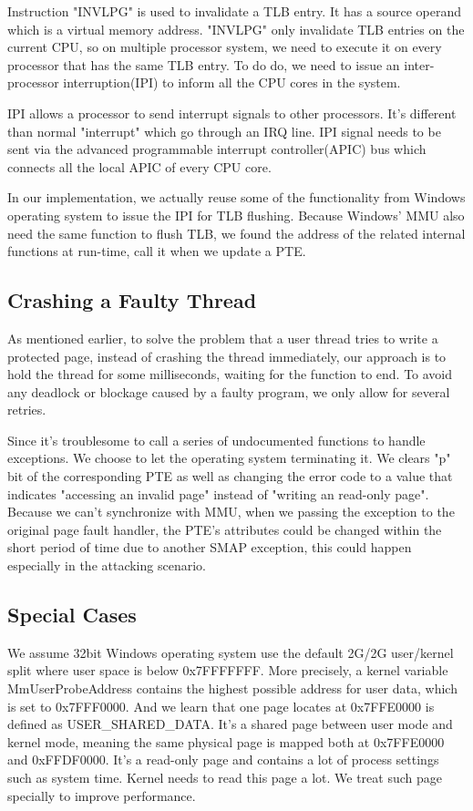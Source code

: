 Instruction "INVLPG" is used to invalidate a TLB entry. It has a source operand which is a virtual memory address. "INVLPG" only invalidate TLB entries on the current CPU, so on multiple processor system, we need to execute it on every processor that has the same TLB entry. To do do, we need to issue an inter-processor interruption(IPI) to inform all the CPU cores in the system.

IPI allows a processor to send interrupt signals to other processors. It's different than normal "interrupt" which go through an IRQ line. IPI signal needs to be sent via the advanced programmable interrupt controller(APIC) bus which connects all the local APIC of every CPU core.

In our implementation, we actually reuse some of the functionality from Windows operating system to issue the IPI for TLB flushing. Because Windows' MMU also need the same function to flush TLB, we found the address of the related internal functions at run-time, call it when we update a PTE. 

\subsection{Crashing a Faulty Thread}

As mentioned earlier, to solve the problem that a user thread tries to write a protected page, instead of crashing the thread immediately, our approach is to hold the thread for some milliseconds, waiting for the function to end. To avoid any deadlock or blockage caused by a faulty program, we only allow for several retries. 

Since it's troublesome to call a series of undocumented functions to handle exceptions. We choose to let the operating system terminating it. We clears "p" bit of the corresponding PTE as well as changing the error code to a value that indicates "accessing an invalid page" instead of "writing an read-only page". Because we can't synchronize with MMU, when we passing the exception to the original page fault handler, the PTE's attributes could be changed within the short period of time due to another SMAP exception, this could happen especially in the attacking scenario. 



\subsection{Special Cases}
We assume 32bit Windows operating system use the default 2G/2G user/kernel split where user space is below 0x7FFFFFFF. More precisely, a kernel variable MmUserProbeAddress contains the highest possible address for user data, which is set to 0x7FFF0000. And we learn that one page locates at 0x7FFE0000 is defined as USER\_SHARED\_DATA. It's a shared page between user mode and kernel mode, meaning the same physical page is mapped both at 0x7FFE0000 and 0xFFDF0000. It's a read-only page and contains a lot of process settings such as system time. Kernel needs to read this page a lot. We treat such page specially to improve performance. 
